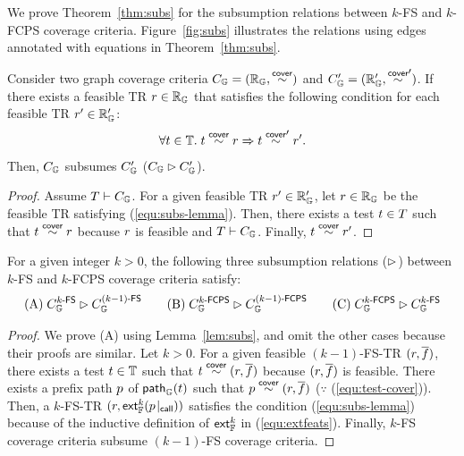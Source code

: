 We prove Theorem~\ref{thm:subs} for the subsumption relations
between $k$-FS and $k$-FCPS coverage criteria.
Figure~\ref{fig:subs} illustrates the relations using edges
annotated with equations in Theorem~\ref{thm:subs}.


\begin{lemma}\label{lem:subs}
  Consider two graph coverage criteria $C_{\mathbb{G}} = (\mathbb{R}_{\mathbb{G}}, \overset{\textsf{cover}}{\sim})$
  and $C_{\mathbb{G}}' = (\mathbb{R}_{\mathbb{G}}', \overset{\textsf{cover}}{\sim}')$.
  If there exists a feasible TR $r \in \mathbb{R}_{\mathbb{G}}$ that satisfies the following
  condition for each feasible TR $r' \in \mathbb{R}_{\mathbb{G}}'$:
  \begin{equation}\label{equ:subs-lemma}
    \forall t \in \mathbb{T}. \; t \overset{\textsf{cover}}{\sim} r \Rightarrow t \overset{\textsf{cover}}{\sim}' r'.
  \end{equation}
  Then, $C_{\mathbb{G}}$ subsumes $C_{\mathbb{G}}'$ ($C_{\mathbb{G}}
  \rhd C_{\mathbb{G}}'$).
\end{lemma}
\begin{proof}
  Assume $T \vdash C_{\mathbb{G}}$.
  For a given feasible TR $r' \in \mathbb{R}_{\mathbb{G}}'$, let $r \in \mathbb{R}_{\mathbb{G}}$
  be the feasible TR satisfying (\ref{equ:subs-lemma}).
  Then, there exists a test $t \in T$ such that $t \overset{\textsf{cover}}{\sim} r$ because
  $r$ is feasible and $T \vdash C_{\mathbb{G}}$.
  Finally, $t \overset{\textsf{cover}}{\sim} r'$.
\end{proof}

\begin{theorem}\label{thm:subs}
  For a given integer $k > 0$, the following three subsumption relations
  ($\rhd$) between $k$-FS and $k$-FCPS coverage criteria satisfy:
  \[
    \text{(A)} \; C_{\mathbb{G}}^{{k}\textsf{-FS}} \rhd C_{\mathbb{G}}^{{(k-1)}\textsf{-FS}} \qquad
    \text{(B)} \; C_{\mathbb{G}}^{{k}\textsf{-FCPS}} \rhd C_{\mathbb{G}}^{{(k-1)}\textsf{-FCPS}} \qquad
    \text{(C)} \; C_{\mathbb{G}}^{{k}\textsf{-FCPS}} \rhd C_{\mathbb{G}}^{{k}\textsf{-FS}}
  \]
\end{theorem}

\begin{proof}
  We prove (A) using Lemma~\ref{lem:subs}, and omit
  the other cases because their proofs are similar.
  Let $k > 0$.
  For a given feasible $(k-1)$-FS-TR $(r, \overline{f})$, there exists a test $t
  \in \mathbb{T}$ such that $t \overset{\textsf{cover}}{\sim} (r, \overline{f})$ because $(r, \overline{f})$
  is feasible.
  There exists a prefix path $p$ of $\textsf{path}_{\mathbb{G}}(t)$ such that $p
  \overset{\textsf{cover}}{\sim} (r, \overline{f})$ ($\because$ (\ref{equ:test-cover})).
  Then, a $k$-FS-TR $(r, \textsf{ext}_{\mathbb{F}}^{k}({p}\!\mid_{\textsf{call}}))$ satisfies the condition
  (\ref{equ:subs-lemma}) because of the inductive definition of $\textsf{ext}_{\mathbb{F}}^{k}$
  in (\ref{equ:extfeats}).
  Finally, $k$-FS coverage criteria subsume $(k-1)$-FS coverage criteria.
\end{proof}
